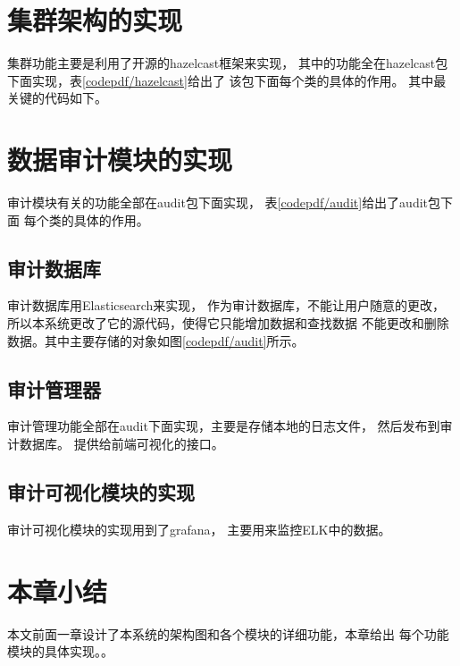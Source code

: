 



\section{集群架构的实现}
集群功能主要是利用了开源的hazelcast框架来实现，
其中的功能全在hazelcast包下面实现，表\ref{codepdf/hazelcast}给出了
该包下面每个类的具体的作用。
其中最关键的代码如下。



\section{数据审计模块的实现}
审计模块有关的功能全部在audit包下面实现，
表\ref{codepdf/audit}给出了audit包下面
每个类的具体的作用。
\subsection{审计数据库}
审计数据库用Elasticsearch来实现，
作为审计数据库，不能让用户随意的更改，
所以本系统更改了它的源代码，使得它只能增加数据和查找数据
不能更改和删除数据。其中主要存储的对象如图\ref{codepdf/audit}所示。
\subsection{审计管理器}
审计管理功能全部在audit下面实现，主要是存储本地的日志文件，
然后发布到审计数据库。
提供给前端可视化的接口。
\subsection{审计可视化模块的实现}
审计可视化模块的实现用到了grafana，
主要用来监控ELK中的数据。
\section{本章小结}
本文前面一章设计了本系统的架构图和各个模块的详细功能，本章给出
每个功能模块的具体实现。。